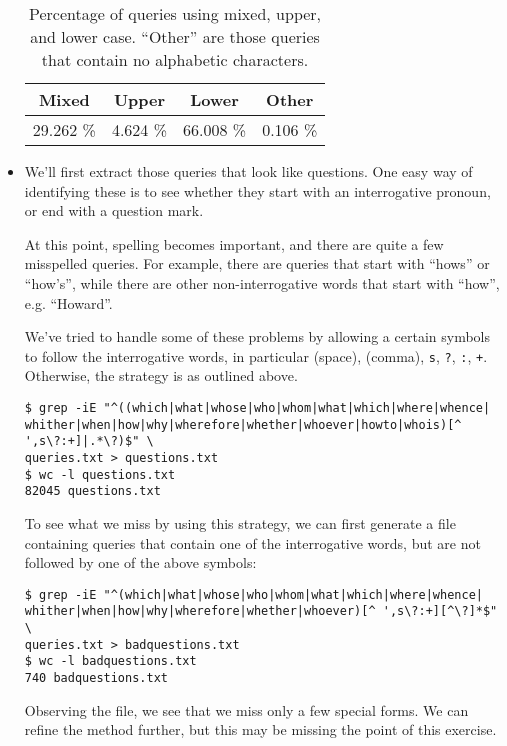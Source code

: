 \begin{itemize}
\begin{table}[h!]
\centering
\begin{tabular}{|c|c|c|c|}
\hline
\textbf{Mixed} & \textbf{Upper} & \textbf{Lower} & \textbf{Other} \\
\hline
29.262 \%      & 4.624 \%       & 66.008 \%      & 0.106 \% \\
\hline
\end{tabular}
\caption[]{Percentage of queries using mixed, upper, and lower case. ``Other''
are those queries that contain no alphabetic characters.}
\label{table:casing}
\end{table}

\item

We'll first extract those queries that look like questions. One easy way of
identifying these is to see whether they start with an interrogative pronoun,
or end with a question mark.

At this point, spelling becomes important, and there are quite a few misspelled
queries. For example, there are queries that start with ``hows'' or ``how's'',
while there are other non-interrogative words that start with ``how'', e.g.
``Howard''.

We've tried to handle some of these problems by allowing a certain symbols to
follow the interrogative words, in particular (space), (comma), \texttt{s},
\texttt{?}, \texttt{:}, \texttt{+}. Otherwise, the strategy is as outlined
above.

\begin{verbatim}
$ grep -iE "^((which|what|whose|who|whom|what|which|where|whence|
whither|when|how|why|wherefore|whether|whoever|howto|whois)[^ ',s\?:+]|.*\?)$" \
queries.txt > questions.txt
$ wc -l questions.txt 
82045 questions.txt
\end{verbatim}

To see what we miss by using this strategy, we can first generate a file
containing queries that contain one of the interrogative words, but are not
followed by one of the above symbols:

\begin{verbatim}
$ grep -iE "^(which|what|whose|who|whom|what|which|where|whence|
whither|when|how|why|wherefore|whether|whoever)[^ ',s\?:+][^\?]*$" \
queries.txt > badquestions.txt
$ wc -l badquestions.txt 
740 badquestions.txt
\end{verbatim}

Observing the file, we see that we miss only a few special forms. We can refine
the method further, but this may be missing the point of this exercise.


\end{itemize}
